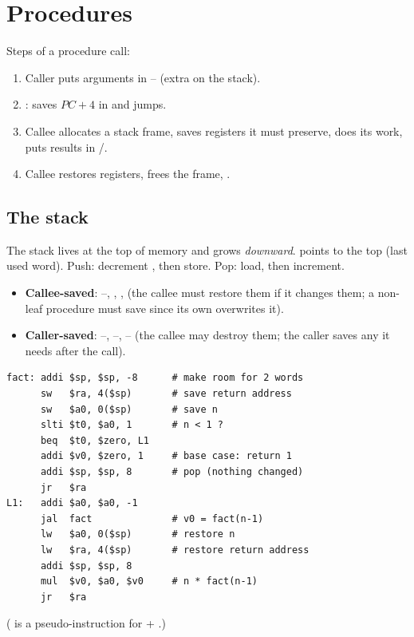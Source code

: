 \section{Procedures}

Steps of a procedure call:
\begin{enumerate}
  \item Caller puts arguments in -- (extra on the stack).
  \item {}: saves $PC + 4$ in  and jumps.
  \item Callee allocates a stack frame, saves registers it must preserve,
    does its work, puts results in /.
  \item Callee restores registers, frees the frame, .
\end{enumerate}

\subsection{The stack}

The stack lives at the top of memory and grows \emph{downward}. 
points to the top (last used word). Push: decrement , then store.
Pop: load, then increment.

\begin{important}
\begin{itemize}
  \item \textbf{Callee-saved}: --, ,
    ,  (the callee must restore them if it changes
    them; a non-leaf procedure must save  since its own
     overwrites it).
  \item \textbf{Caller-saved}: --, --,
    -- (the callee may destroy them; the caller saves
    any it needs after the call).
\end{itemize}
\end{important}

\begin{example}
\begin{lstlisting}[style=mips]
fact: addi $sp, $sp, -8      # make room for 2 words
      sw   $ra, 4($sp)       # save return address
      sw   $a0, 0($sp)       # save n
      slti $t0, $a0, 1       # n < 1 ?
      beq  $t0, $zero, L1
      addi $v0, $zero, 1     # base case: return 1
      addi $sp, $sp, 8       # pop (nothing changed)
      jr   $ra
L1:   addi $a0, $a0, -1
      jal  fact              # v0 = fact(n-1)
      lw   $a0, 0($sp)       # restore n
      lw   $ra, 4($sp)       # restore return address
      addi $sp, $sp, 8
      mul  $v0, $a0, $v0     # n * fact(n-1)
      jr   $ra
\end{lstlisting}
( is a pseudo-instruction for  + .)
\end{example}

